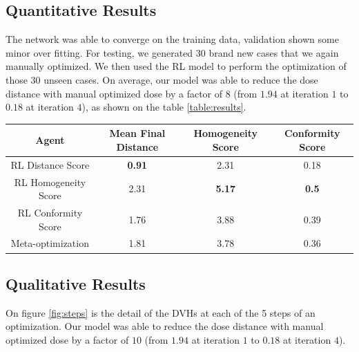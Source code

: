 \subsection{Quantitative Results}
The network was able to converge on the training data, validation shown some minor over fitting.
For testing, we generated 30 brand new cases that we again manually optimized.
We then used the RL model to perform the optimization of those 30 unseen cases.
On average, our model was able to reduce the dose distance with manual optimized dose by a factor of $8$ (from $1.94$ at iteration $1$ to $0.18$ at iteration $4$), as shown on the table \ref{table:results}.

\begin{center}
	\begin{tabular}{| c || c | c | c |} 
		\hline
		Agent & Mean Final Distance & Homogeneity Score & Conformity Score\\ 
		\hline
		RL Distance Score & \textbf{0.91} & 2.31 & 0.18 \\ 
		RL Homogeneity Score & 2.31 & \textbf{5.17} & \textbf{0.5} \\
		RL Conformity Score &  1.76  & 3.88 & 0.39 \\
		Meta-optimization & 1.81 & 3.78 & 0.36 \\	
		\hline
	\end{tabular}
	\label{table:results}
\end{center}


\subsection{Qualitative Results}
On figure \ref{fig:steps} is the detail of the DVHs at each of the 5 steps of an optimization.
Our model was able to reduce the dose distance with manual optimized dose by a factor of $10$ (from $1.94$ at iteration $1$ to $0.18$ at iteration $4$).

